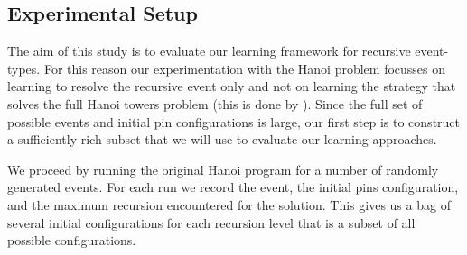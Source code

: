 
\subsection{Experimental Setup} \label{sec:setup}

The aim of this study is to evaluate our learning framework for recursive event-types. For this reason our experimentation with the Hanoi problem focusses on learning to resolve the recursive event  only and not on learning the strategy that solves the full Hanoi towers problem (this is done by ). Since the full set of possible  events and initial pin configurations is large, our first step is to construct a sufficiently rich subset that we will use to evaluate our learning approaches. 

We proceed by running the original Hanoi program for a number of randomly generated  events. For each run we record the  event, the initial pins configuration, and the maximum recursion encountered for the solution. This gives us a bag of several initial configurations for each recursion level that is a subset of all possible configurations. 

